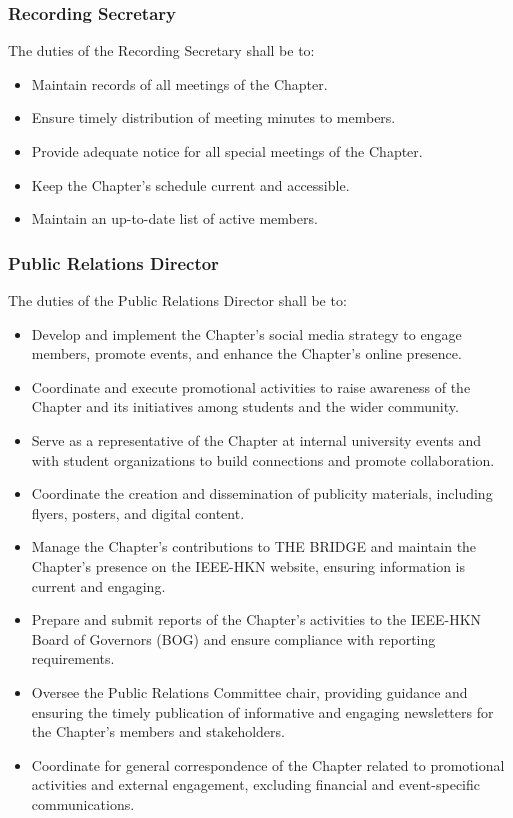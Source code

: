 \documentclass[10pt, oneside]{article}
\begin{document}
\subsubsection{Recording Secretary}
The duties of the Recording Secretary shall be to:
\begin{itemize}
    \item Maintain records of all meetings of the Chapter.
    \item Ensure timely distribution of meeting minutes to members.
    \item Provide adequate notice for all special meetings of the Chapter.
    \item Keep the Chapter's schedule current and accessible.
    \item Maintain an up-to-date list of active members.
\end{itemize}
\subsubsection{Public Relations Director}
The duties of the Public Relations Director shall be to:
\begin{itemize}
    \item Develop and implement the Chapter's social media strategy to engage members, promote events, and enhance the Chapter's online presence.
    \item Coordinate and execute promotional activities to raise awareness of the Chapter and its initiatives among students and the wider community.
    \item Serve as a representative of the Chapter at internal university events and with student organizations to build connections and promote collaboration.
    \item Coordinate the creation and dissemination of publicity materials, including flyers, posters, and digital content.
    \item Manage the Chapter's contributions to THE BRIDGE and maintain the Chapter's presence on the IEEE-HKN website, ensuring information is current and engaging.
    \item Prepare and submit reports of the Chapter’s activities to the IEEE-HKN Board of Governors (BOG) and ensure compliance with reporting requirements.
    \item Oversee the Public Relations Committee chair, providing guidance and ensuring the timely publication of informative and engaging newsletters for the Chapter's members and stakeholders.
    \item Coordinate for general correspondence of the Chapter related to promotional activities and external engagement, excluding financial and event-specific communications.
\end{itemize}
\end{document}
